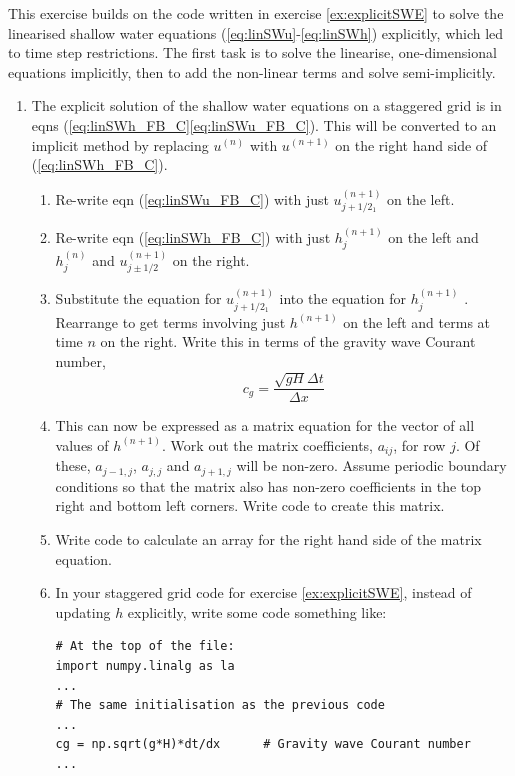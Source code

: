 This exercise builds on the code written in exercise \ref{ex:explicitSWE}
to solve the linearised shallow water equations (\ref{eq:linSWu}-\ref{eq:linSWh})
explicitly, which led to time step restrictions. The first task is
to solve the linearise, one-dimensional equations implicitly, then
to add the non-linear terms and solve semi-implicitly. 
\begin{enumerate}
\item The explicit solution of the shallow water equations on a staggered
grid is in eqns (\ref{eq:linSWh_FB_C}\ref{eq:linSWu_FB_C}). This
will be converted to an implicit method by replacing $u^{(n)}$ with
$u^{(n+1)}$ on the right hand side of (\ref{eq:linSWh_FB_C}). 
\begin{enumerate}
\item Re-write eqn (\ref{eq:linSWu_FB_C}) with just $u_{j+1/2_{1}}^{(n+1)}$
on the left.
\item Re-write eqn (\ref{eq:linSWh_FB_C}) with just $h_{j}^{(n+1)}$ on
the left and $h_{j}^{(n)}$ and $u_{j\pm1/2}^{(n+1)}$ on the right.
\item Substitute the equation for $u_{j+1/2_{1}}^{(n+1)}$ into the equation
for $h_{j}^{(n+1)}$ . Rearrange to get terms involving just $h^{(n+1)}$
on the left and terms at time $n$ on the right. Write this in terms
of the gravity wave Courant number, 
\begin{equation}
c_{g}=\frac{\sqrt{gH}\Delta t}{\Delta x}
\end{equation}
\item This can now be expressed as a matrix equation for the vector of all
values of $h^{(n+1)}$. Work out the matrix coefficients, $a_{ij}$,
for row $j$. Of these, $a_{j-1,j}$, $a_{j,j}$ and $a_{j+1,j}$
will be non-zero. Assume periodic boundary conditions so that the
matrix also has non-zero coefficients in the top right and bottom
left corners. Write code to create this matrix.
\item Write code to calculate an array for the right hand side of the matrix
equation. 
\item In your staggered grid code for exercise \ref{ex:explicitSWE}, instead
of updating $h$ explicitly, write some code something like:
\begin{lstlisting}
# At the top of the file:
import numpy.linalg as la
...
# The same initialisation as the previous code
...
cg = np.sqrt(g*H)*dt/dx      # Gravity wave Courant number
...


\end{lstlisting}
\end{enumerate}
\end{enumerate}
